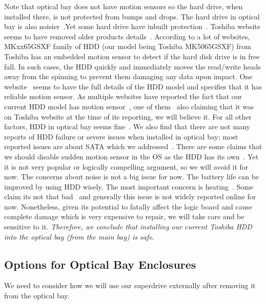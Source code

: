 Note that optical bay does not have motion sensors so the hard drive, when installed there, is not protected from bumps and drops. The hard drive in optical bay is also noisier~\cite{applesthdnoisy,applestsmsop}.Yet some hard drive have inbuilt protection~\cite{macrumoursssdreplaceguide}. 
Toshiba website seems to have removed older products details~\cite{toshibaforum}. According to a lot of websites, MKxx65GSXF family of HDD (our model being Toshiba MK5065GSXF) from Toshiba has an embedded motion sensor to detect if the hard disk drive is in free fall. In such cases, the HDD quickly and immediately moves the read/write heads away from the spinning to prevent them damaging any data upon impact. 
One website~\cite{toshibadet} seems to have the full details of the HDD model and specifies that it has reliable motion sensor.
As multiple websites have reported the fact that our current HDD model has motion sensor~\cite{toshibamotion1,toshibamotion2,toshibamotion3,macrumourtoshiba,applestsmsop}, one of them~\cite{macrumourtoshiba} also claiming that it was on Toshiba website at the time of its reporting, we will believe it.
For all other factors, HDD in optical bay seems fine~\cite{applesthdop}. 
We also find that there are not many reports of HDD failure or severe issues when installed in optical bay; most reported issues are about SATA which we addressed~\cite{appledisisshdop,ifixitisshdop,ifixitisshdop2}. 
There are some claims that we should disable sudden motion sensor in the OS as the HDD has its own~\cite{remielhddop}. Yet it is not very popular or logically compelling argument, so we will avoid it for now.
The concerns about noise is not a big issue for now. The battery life can be improved by using HDD wisely.
The most important concern is heating~\cite{applestsmsop}. Some claim its not that bad~\cite{applesthdop} and generally this issue is not widely reported online for now. Nonetheless, given its potential to fatally affect the logic board and cause complete damage which is very expensive to repair, we will take care and be sensitive to it.
\emph{ Therefore, we conclude that installing our current Toshiba HDD into the optical bay (from the main bay) is safe}.


\subsection{Options for Optical Bay Enclosures}
\label{opticalBayEnclosure}
We need to consider how we will use our superdrive externally after removing it from the optical bay.

